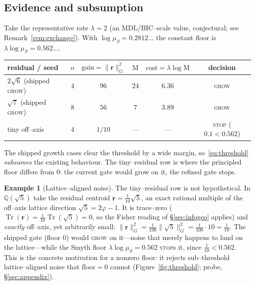\documentclass[11pt]{article}
\theoremstyle{plain}
\theoremstyle{definition}
\newtheorem{example}[theorem]{Example}
\theoremstyle{remark}
\newcommand{\Q}{\mathbb{Q}}
\newcommand{\Tr}{\operatorname{Tr}}
\newcommand{\Mah}{\mathrm{M}}
\newcommand{\rr}{\mathbf{r}}
\newcommand{\GG}{G}
\begin{document}
\subsection{Evidence and subsumption}
Take the representative rate $\lambda=2$ (an MDL/BIC--scale value, conjectural; see
Remark~\ref{rem:exchange}). With $\log\mu_S=0.2812\ldots$ the constant floor is $\lambda\log\mu_S=0.562\ldots$.
\begin{center}
\begin{tabular}{lccccc}
\toprule
residual / seed & $n$ & $\mathrm{gain}=\lVert\rr\rVert_{\GG}^2$ & $\Mah$ & $\mathrm{cost}=\lambda\log\Mah$ & decision \\
\midrule
$2\sqrt6$ (shipped \textsc{grow}) & $4$ & $96$ & $24$ & $6.36$ & \textsc{grow} \\
$\sqrt7$ (shipped \textsc{grow})  & $8$ & $56$ & $7$  & $3.89$ & \textsc{grow} \\
tiny off--axis & $4$ & $1/10$ & --- & --- & \textsc{stop} ($0.1<0.562$) \\
\bottomrule
\end{tabular}
\end{center}
The shipped growth cases clear the threshold by a wide margin, so~\eqref{eq:threshold} \emph{subsumes} the
existing behaviour. The tiny--residual row is where the principled floor differs from $0$: the current gate
would grow on it, the refined gate stops.

\begin{example}[Lattice--aligned noise]\label{ex:noise}
The tiny--residual row is not hypothetical. In $\Q(\sqrt5)$ take the residual centroid $\rr=\tfrac1{10}\sqrt5$,
an exact rational multiple of the off--axis lattice direction $\sqrt5=2\varphi-1$. It is trace--zero
($\Tr(\rr)=\tfrac1{10}\Tr(\sqrt5)=0$, so the Fisher reading of \S\ref{sec:infogeo} applies) and \emph{exactly}
off--axis, yet arbitrarily small:
$\lVert\rr\rVert_{\GG}^2=\tfrac1{100}\lVert\sqrt5\rVert_{\GG}^2=\tfrac1{100}\cdot 10=\tfrac1{10}$. The shipped
gate (floor $0$) would \textsc{grow} on it---noise that merely happens to land on the lattice---while the Smyth
floor $\lambda\log\mu_S=0.562$ \textsc{stop}s it, since $\tfrac1{10}<0.562$. This is the concrete motivation
for a nonzero floor: it rejects sub--threshold lattice--aligned noise that $\mathrm{floor}=0$ cannot
(Figure~\ref{fig:threshold}; probe, \S\ref{sec:appendix}).
\end{example}
\end{document}
